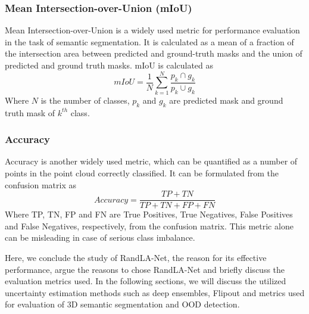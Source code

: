 \subsubsection{Mean Intersection-over-Union (mIoU)}
Mean Intersection-over-Union is a widely used metric for performance evaluation in the task of semantic segmentation.
It is calculated as a mean of a fraction of the intersection area between predicted and ground-truth masks and the union of predicted and ground truth masks.
mIoU is calculated as
$$mIoU=\frac{1}{N}\sum_{k=1}^N \frac{p_k\cap g_k}{p_k \cup g_k}$$
Where $N$ is the number of classes, $p_k$ and $g_k$ are predicted mask and ground truth mask of $k^{th}$ class.

\subsubsection{Accuracy}
Accuracy is another widely used metric, which can be quantified as a number of points in the point cloud correctly classified.
It can be formulated from the confusion matrix as
$$Accuracy = \frac{TP+TN}{TP+TN+FP+FN}$$
Where TP, TN, FP and FN are True Positives, True Negatives, False Positives and False Negatives, respectively, from the confusion matrix.
This metric alone can be misleading in case of serious class imbalance.

Here, we conclude the study of RandLA-Net, the reason for its effective performance, argue the reasons to chose RandLA-Net and briefly discuss the evaluation metrics used.
In the following sections, we will discuss the utilized uncertainty estimation methods such as deep ensembles, Flipout and metrics used for evaluation of 3D semantic segmentation and OOD detection.

